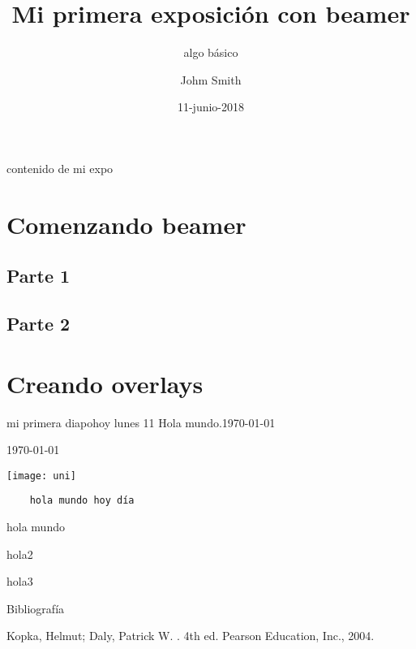 \documentclass[utf8,spanish,
xcolor={x11names, table}]{beamer}
\title{Mi primera exposición con beamer}
\subtitle{algo básico}
\author{Johm Smith}
\institute[UNI]{Universidad Nacional de Ingeniería}%
\date{11-junio-2018}
\begin{document}
\maketitle
\begin{frame}{contenido de mi expo}
	\tableofcontents%
\end{frame}



\section{Comenzando beamer}
\subsection{Parte 1}
\subsection{Parte 2}

\section{Creando overlays}

\begin{frame}{mi primera diapo}{hoy lunes 11}
Hola mundo.\today
\end{frame}

\begin{frame}[t]
\today%
\end{frame}

\begin{frame}[plain]
	\hspace*{-1cm}\texttt{[image: uni]}
\end{frame}

\begin{frame}[fragile]
	\begin{verbatim}
	hola mundo hoy día
	\end{verbatim}
\end{frame}

\begin{frame}
	hola mundo \pause
	
	hola2 \pause
	
	hola3
\end{frame}

\begin{frame}{Bibliografía}
\begin{thebibliography}{9}%
Kopka, Helmut; Daly, Patrick W.
.
4th ed.
\newblock Pearson Education,
Inc., 2004.
\end{thebibliography}
\end{frame}
\end{document}
